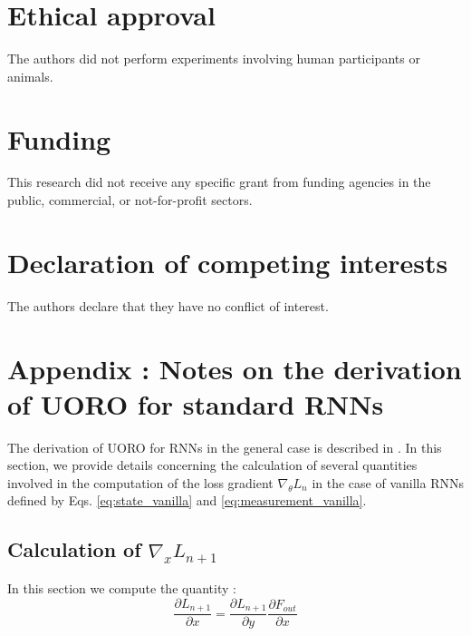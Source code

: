 \documentclass[twocolumn,a4paper]{svjour3} \sloppy          \smartqed
\begin{document}
\section*{Ethical approval}

The authors did not perform experiments involving human participants or animals.


\section*{Funding} 

This research did not receive any specific grant from funding agencies in the public, commercial, or not-for-profit sectors.


\section*{Declaration of competing interests}

The authors declare that they have no conflict of interest.



      


\appendix


\section{Appendix : Notes on the derivation of UORO for standard RNNs}\label{appendix:UORO_alg}


The derivation of UORO for RNNs in the general case is described in \citep{tallec2017unbiased}. In this section, we provide details concerning the calculation of several quantities involved in the computation of the loss gradient $\nabla_{\theta} L_n$ in the case of vanilla RNNs defined by Eqs. \ref{eq:state_vanilla} and \ref{eq:measurement_vanilla}.

\subsection{Calculation of $\nabla_x L_{n+1}$}
\label{Calculation of nabla_x L_n+1}

In this section we compute the quantity \footnotemark:
\begin{equation} \label{eq:delta_x definition}
\frac{\partial L_{n+1}}{\partial x} = \frac{\partial L_{n+1}}{\partial y} \frac{\partial F_{out}}{\partial x}
\end{equation}
\end{document}
